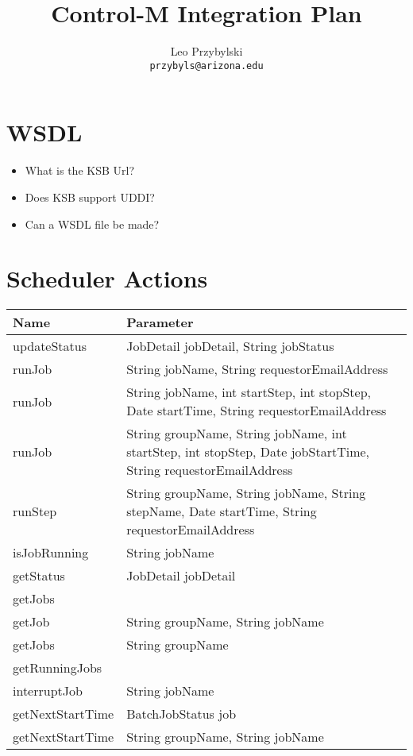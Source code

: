 \documentclass[12pt,notitlepage]{article}
\author{Leo Przybylski \\
\texttt{przybyls@arizona.edu}}
\title{Control-M Integration Plan}
\begin{document}
\tableofcontents
\maketitle

\section{WSDL}
\begin{itemize}
  \item What is the KSB Url?
  \item Does KSB support UDDI?
  \item Can a WSDL file be made?
\end{itemize}

\section{Scheduler Actions}
\begin{tabular}{|l|l|}
  Name & Parameter \\
  \hline
  
      updateStatus & JobDetail jobDetail, String jobStatus \\
  \hline

      runJob& String jobName, String requestorEmailAddress \\
  \hline

      runJob& String jobName, int startStep, int stopStep, Date startTime, String requestorEmailAddress \\
  \hline

      runJob& String groupName, String jobName, int startStep, int stopStep, Date jobStartTime, String requestorEmailAddress\\
   \hline

      runStep& String groupName, String jobName, String stepName, Date startTime, String requestorEmailAddress \\
  \hline

     isJobRunning& String jobName \\
  \hline

     getStatus& JobDetail jobDetail \\
  \hline

     getJobs & \\
  \hline

     getJob& String groupName, String jobName \\
  \hline

     getJobs & String groupName \\
  \hline

     getRunningJobs & \\
  \hline
       
       
       interruptJob& String jobName \\
  \hline

     getNextStartTime & BatchJobStatus job \\
  \hline

     getNextStartTime& String groupName, String jobName \\
  \hline
\end{tabular}
\end{document}
